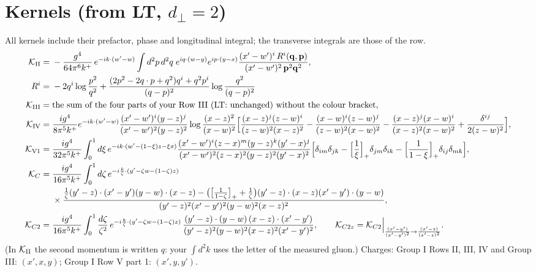 \documentclass[10pt]{article}
\numberwithin{equation}{section}
\begin{document}
\section{Kernels (from LT, $d_\perp=2$)}\label{sec:kern}
All kernels include their prefactor, phase and longitudinal integral; the transverse integrals are those of the row.
\begin{align}
\mathcal K_{\rm II}={}&-\frac{g^4}{64\pi^6k^+}\,e^{-ik\cdot(w'-w)}\int d^2p\,d^2q\;e^{iq\cdot(w-y)}e^{ip\cdot(y-x)}\frac{(x'-w')^i\,R^i(\mathbf q,\mathbf p)}{(x'-w')^2\,\mathbf p^2\mathbf q^2},\notag\\ R^i={}&-2q^i\log\frac{p^2}{q^2}+\frac{(2p^2-2q\cdot p+q^2)q^i+q^2p^i}{(q-p)^2}\log\frac{q^2}{(q-p)^2}\\
\mathcal K_{\rm III}={}&\text{the sum of the four parts of your Row III (LT: unchanged) without the colour bracket},\\
\mathcal K_{\rm IV}={}&\frac{ig^4}{8\pi^5k^+}e^{-ik\cdot(w'-w)}\frac{(x'-w')^{i}(y-z)^{j}}{(x'-w')^{2}(y-z)^{2}}\log\frac{(x-z)^{2}}{(x-w)^{2}}\Big[\frac{(x-z)^{j}(z-w)^{i}}{(z-w)^{2}(x-z)^{2}}-\frac{(x-w)^{i}(z-w)^{j}}{(z-w)^{2}(x-w)^{2}}-\frac{(x-z)^{j}(x-w)^{i}}{(x-z)^{2}(x-w)^{2}}+\frac{\delta^{ij}}{2(z-w)^{2}}\Big],\\
\mathcal K_{\rm V1}={}&\frac{ig^4}{32\pi^5k^+}\int_0^1d\xi\,e^{-ik\cdot(w'-(1-\xi)z-\xi x)}\frac{(x'-w')^{i}(z-x)^{m}(y-z)^{k}(y'-x)^{j}}{(x'-w')^{2}(z-x)^{2}(y-z)^{2}(y'-x)^{2}}\Big[\delta_{im}\delta_{jk}-\Big[\frac1\xi\Big]_+\delta_{jm}\delta_{ik}-\Big[\frac{1}{1-\xi}\Big]_+\delta_{ij}\delta_{mk}\Big],\\
\mathcal K_{C}={}&\frac{ig^4}{16\pi^5k^+}\int_0^1d\zeta\,e^{-i\frac{k}{\zeta}\cdot(y'-\zeta w-(1-\zeta)z)}\notag\\&\times\frac{\frac1\zeta(y'-z)\cdot(x'-y')(y-w)\cdot(x-z)-\big(\big[\frac1{1-\zeta}\big]_++\frac1\zeta\big)(y'-z)\cdot(x-z)(x'-y')\cdot(y-w)}{(y'-z)^{2}(x'-y')^{2}(y-w)^{2}(x-z)^{2}},\\
\mathcal K_{C2}={}&\frac{ig^4}{16\pi^5k^+}\int_0^1\frac{d\zeta}{\zeta^2}\,e^{-i\frac{k}{\zeta}\cdot(y'-\zeta w-(1-\zeta)z)}\,\frac{(y'-z)\cdot(y-w)\,(x-z)\cdot(x'-y')}{(y'-z)^{2}(y-w)^{2}(x-z)^{2}(x'-y')^{2}},\qquad
\mathcal K_{C2z}=\mathcal K_{C2}\Big|_{\frac{(x'-y')}{(x'-y')^2}\to\frac{(x'-z)}{(x'-z)^2}}.
\end{align}
(In $\mathcal K_{\rm II}$ the second momentum is written $q$: your $\int d^2k$ uses the letter of the measured gluon.) Charges: Group I Rows II, III, IV and Group III: $(x',x,y)$; Group I Row V part 1: $(x',y,y')$.
\end{document}

